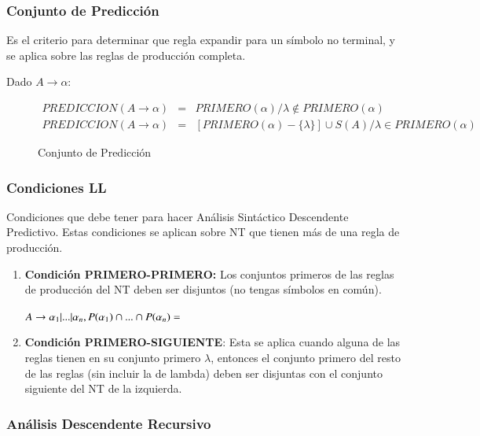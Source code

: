 \documentclass[12pt]{report} %
\begin{document}
\subsubsection{Conjunto de Predicción}

Es el criterio para determinar que regla expandir para un símbolo no
terminal, y se aplica sobre las reglas de producción completa.

Dado \(A \rightarrow \alpha\):

\begin{figure}[H]
 \begin{eqnarray*}
    PREDICCION(A \rightarrow \alpha) &=& PRIMERO(\alpha) / \lambda \notin PRIMERO(\alpha) \\
    PREDICCION(A \rightarrow \alpha) &=& [PRIMERO(\alpha)-\{\lambda\}] \cup S(A) / \lambda \in PRIMERO(\alpha)
 \end{eqnarray*}

  \captionsetup{justification=centering}
  \caption{Conjunto de Predicción}
\end{figure}

\pagebreak
\subsubsection{Condiciones LL}

Condiciones que debe tener para hacer Análisis Sintáctico Descendente
Predictivo.
Estas condiciones se aplican sobre NT que tienen más de una regla de
producción.

\begin{enumerate}
\def\labelenumi{\arabic{enumi}.}

\item
  \textbf{Condición PRIMERO-PRIMERO:} Los conjuntos primeros de las
  reglas de producción del NT deben ser disjuntos (no tengas símbolos en
  común).

  \(A \rightarrow \alpha_1 |...|\alpha_n, P(\alpha_1) \cap ... \cap P(\alpha_n) = \empty\)
\item
  \textbf{Condición PRIMERO-SIGUIENTE}: Esta se aplica cuando alguna de
  las reglas tienen en su conjunto primero \(\lambda\), entonces el
  conjunto primero del resto de las reglas (sin incluir la de lambda)
  deben ser disjuntas con el conjunto siguiente del NT de la izquierda.
\end{enumerate}


\subsubsection{Análisis Descendente Recursivo}
\end{document}
